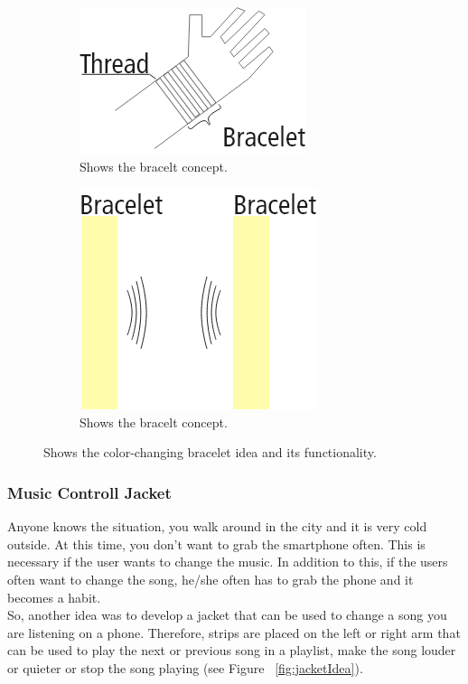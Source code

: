 \documentclass[04_projectProcess.tex]{subfiles}
\begin{document}
    \begin{figure}[H]
        \centering
        \begin{subfigure}{.45\textwidth}
            \centering
            \includegraphics[scale=0.4]{images/projectideas/bracelt_1.png}
            \caption{Shows the bracelt concept.}
            \label{fig:braceltIdea}
            \vspace{6mm}
        \end{subfigure}
        \medskip
        \hspace{1mm}
        \begin{subfigure}{.45\textwidth}
            \centering
            \includegraphics[scale=0.4]{images/projectideas/bracelt_2.png}
            \caption{Shows the bracelt concept.}
            \label{fig:braceltIdea}
            \vspace{6mm}
        \end{subfigure}
        \caption{Shows the color-changing bracelet idea and its functionality.}
        \label{fig:drillingProcess}
    \end{figure}

    \subsubsection{Music Controll Jacket}
    \begin{flushleft}
        Anyone knows the situation, you walk around in the city and it is very cold outside. At this time, 
        you don't want to grab the smartphone often. This is necessary if the user wants to change the 
        music. In addition to this, if the users often want to change the song, he/she often has to grab
        the phone and it becomes a habit. \\
        So, another idea was to develop a jacket that can be used to change a song you are listening on a 
        phone. Therefore, strips are placed on the left or right arm that can be used to play the next or 
        previous song in a playlist, make the song louder or quieter or stop the song playing (see Figure 
        ~\ref{fig:jacketIdea}).
    \end{flushleft}
\end{document}
